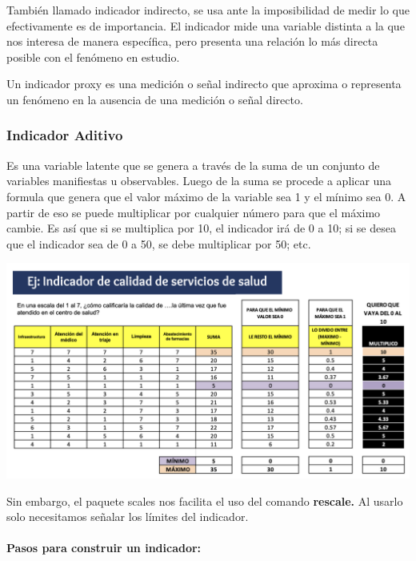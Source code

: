 \documentclass[
]{article}
\begin{document}
También llamado indicador indirecto, se usa ante la imposibilidad de
medir lo que efectivamente es de importancia. El indicador mide una
variable distinta a la que nos interesa de manera específica, pero
presenta una relación lo más directa posible con el fenómeno en estudio.

Un indicador proxy es una medición o señal indirecto que aproxima o
representa un fenómeno en la ausencia de una medición o señal directo.

\hypertarget{indicador-aditivo}{%
\subsubsection{\texorpdfstring{\textbf{Indicador
Aditivo}}{Indicador Aditivo}}\label{indicador-aditivo}}

Es una variable latente que se genera a través de la suma de un conjunto
de variables manifiestas u observables. Luego de la suma se procede a
aplicar una formula que genera que el valor máximo de la variable sea 1
y el mínimo sea 0. A partir de eso se puede multiplicar por cualquier
número para que el máximo cambie. Es así que si se multiplica por 10, el
indicador irá de 0 a 10; si se desea que el indicador sea de 0 a 50, se
debe multiplicar por 50; etc.

\begin{center}\includegraphics[width=0.6\linewidth]{pd2_ejemplo} \end{center}

Sin embargo, el paquete scales nos facilita el uso del comando
\textbf{rescale.} Al usarlo solo necesitamos señalar los límites del
indicador.

\hypertarget{pasos-para-construir-un-indicador}{%
\paragraph{Pasos para construir un
indicador:}\label{pasos-para-construir-un-indicador}}
\end{document}
